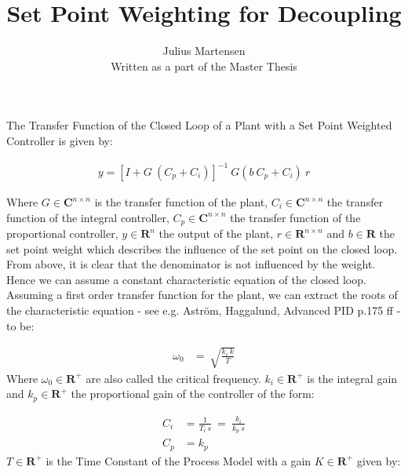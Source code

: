 \documentclass[12pt]{article}
\begin{document}
 
 
 
\title{Set Point Weighting for Decoupling}%
\author{Julius Martensen\\ %
Written as a part of the Master Thesis} %
 
\maketitle

The Transfer Function of the Closed Loop of a Plant with a Set Point Weighted Controller is given by:

\begin{align*}
y = \left[ I + G~(C_p+C_i)\right]^{-1} ~ G(b~C_p + C_i ) ~r 
\end{align*}

Where $G \in \mathbf{C}^{n \times n}$ is the transfer function of the plant, $C_i \in \mathbf{C}^{n \times n}$ the transfer function of the integral controller, $C_p \in \mathbf{C}^{n \times n}$ the transfer function of the proportional controller, $y \in \mathbf{R}^n$  the output of the plant, $r \in \mathbf{R}^{n \times n}$ and $b \in \mathbf{R}$ the set point weight which describes the influence of the set point on the closed loop. \\

From above, it is clear that the denominator is not influenced by the weight. Hence we can assume a constant characteristic equation of the closed loop.\\

Assuming a first order transfer function for the plant, we can extract the roots of the characteristic equation - see e.g. Aström, Haggalund, Advanced PID p.175 ff - to be:

\begin{align*}
\omega_0 &= ~ \sqrt{ \frac{k_i ~k}{T} }
\end{align*}
Where $\omega_0 \in \mathbf{R}^{+}$ are also called the critical frequency. $k_i \in \mathbf{R}^{+}$ is the integral gain and $k_p \in \mathbf{R}^{+}$ the proportional gain of the controller of the form:

\begin{align*}
C_i &= \frac{1}{T_i~s} ~= ~\frac{k_i}{k_p ~s} \\
C_p &= k_p
\end{align*}
$T \in \mathbf{R}^{+} $ is the Time Constant of the Process Model with a gain $K \in \mathbf{R}^{+}$ given by:
\end{document}
